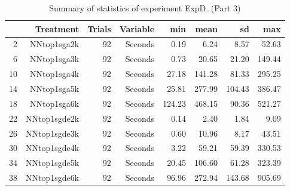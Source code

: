 \begin{table}[ht]
\centering
\begin{tabular}{rrrrrrrr}
  \hline
 & Treatment & Trials & Variable & min & mean & sd & max \\ 
  \hline
2 & NNtop1sga2k &  92 & Seconds & 0.19 & 6.24 & 8.57 & 52.63 \\ 
  6 & NNtop1sga3k &  92 & Seconds & 0.73 & 20.65 & 21.20 & 149.44 \\ 
  10 & NNtop1sga4k &  92 & Seconds & 27.18 & 141.28 & 81.33 & 295.25 \\ 
  14 & NNtop1sga5k &  92 & Seconds & 25.81 & 277.99 & 104.43 & 386.47 \\ 
  18 & NNtop1sga6k &  92 & Seconds & 124.23 & 468.15 & 90.36 & 521.27 \\ 
  22 & NNtop1sgde2k &  92 & Seconds & 0.14 & 2.40 & 1.84 & 9.09 \\ 
  26 & NNtop1sgde3k &  92 & Seconds & 0.60 & 10.96 & 8.17 & 43.51 \\ 
  30 & NNtop1sgde4k &  92 & Seconds & 3.22 & 59.21 & 59.39 & 330.53 \\ 
  34 & NNtop1sgde5k &  92 & Seconds & 20.45 & 106.60 & 61.28 & 323.39 \\ 
  38 & NNtop1sgde6k &  92 & Seconds & 96.96 & 272.94 & 143.68 & 905.69 \\ 
   \hline
\end{tabular}
\caption{Summary of statistics of experiment ExpD. (Part 3)} 
\end{table}
